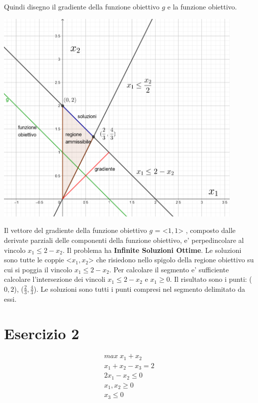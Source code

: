 \documentclass[a4paper,12pt,oneside]{article}
\begin{document}
    Quindi disegno il gradiente della funzione obiettivo $g$ e la funzione obiettivo.

    \begin{center}
        \includegraphics[width=12cm]{seconda-fase.png}
    \end{center}

    Il vettore del gradiente della funzione obiettivo $g$ = <$1, 1$> , composto dalle derivate parziali delle componenti della funzione obiettivo, e' perpedincolare al vincolo $x_1 \leq 2 - x_2$.
    Il problema ha \textbf{Infinite Soluzioni Ottime}.
    Le soluzioni sono tutte le coppie <$x_1, x_2$> che risiedono nello spigolo della regione obiettivo su cui si poggia il vincolo $x_1 \leq 2 - x_2$.
    Per calcolare il segmento e' sufficiente calcolare l'intersezione dei vincoli $x_1 \leq 2 - x_2$ e $x_1 \geq 0$.
    Il risultato sono i punti: ($0, 2$),  ($\frac 2 3, \frac 4 3$). Le soluzioni sono tutti i punti compresi nel segmento delimitato da essi.

    \newpage

    \section{Esercizio 2}

    \begin{align}
        \text{$max \; x_1 + x_2$} \\
        \text{$x_1 + x_2 - x_3 = 2$} \\
        \text{$2 x_1 - x_2 \leq 0$} \\
        \text{$x_1, x_2 \geq 0$} \\
        \text{$x_3 \leq 0$}
    \end{align}
\end{document}
